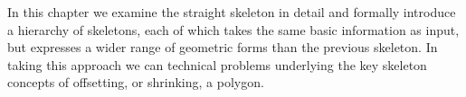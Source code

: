 In this chapter we examine the straight skeleton in detail and formally introduce a hierarchy of skeletons, each of which takes the same basic information as input, but expresses a wider range of geometric forms than the previous skeleton. In taking this approach we can technical problems underlying the key skeleton concepts of offsetting, or shrinking, a polygon.





